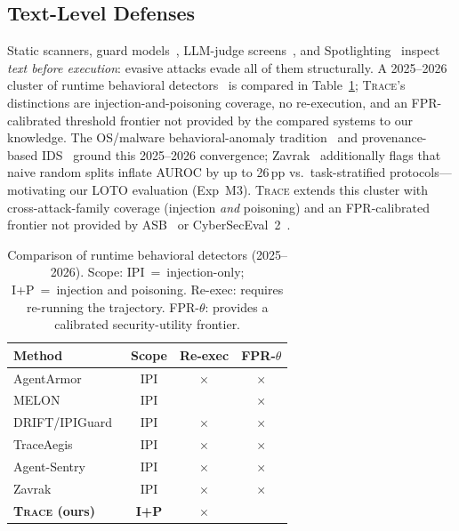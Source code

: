 \documentclass[conference]{IEEEtran}
\begin{document}
\subsection{Text-Level Defenses}

Static scanners, guard models~\cite{inan2023llama}, LLM-judge
screens~\cite{yi2023benchmarking}, and Spotlighting~\cite{hines2024spotlighting}
inspect \emph{text before execution}: evasive attacks evade all of them
structurally.  A 2025--2026 cluster of runtime behavioral
detectors~\cite{liu2025traceaegis,sequeira2026agentsentry,
yu2026frauddetection,zavrak2026contentaware} is compared in
Table~\ref{tab:comparison}; \textsc{Trace}'s distinctions are
injection-and-poisoning coverage, no re-execution, and an
FPR-calibrated threshold frontier not provided by the compared
systems to our knowledge.
The OS/malware behavioral-anomaly tradition~\cite{forrest1996sense,
sekar2001fast,rieck2011automatic,buczak2016survey} and provenance-based
IDS~\cite{zipperle2022pids,cheng2024kairos} ground this 2025--2026
convergence; Zavrak~\cite{zavrak2026contentaware} additionally flags
that naive random splits inflate AUROC by up to 26\,pp vs.\
task-stratified protocols---motivating our LOTO evaluation (Exp~M3).
\textsc{Trace} extends this cluster with cross-attack-family coverage
(injection \emph{and} poisoning) and an FPR-calibrated frontier not
provided by ASB~\cite{zhang2024agentsecuritybench} or
CyberSecEval~2~\cite{bhatt2024cyberseceval2}.

\begin{table}[t]
\centering\small
\caption{Comparison of runtime behavioral detectors (2025--2026).
  Scope: IPI~=~injection-only; I+P~=~injection and poisoning.
  Re-exec: requires re-running the trajectory.
  FPR-$\theta$: provides a calibrated security-utility frontier.}
\label{tab:comparison}
\begin{tabular}{lccc}
\toprule
Method & Scope & Re-exec & FPR-$\theta$ \\
\midrule
AgentArmor~\cite{wang2025agentarmor}              & IPI & $\times$ & $\times$ \\
MELON~\cite{zhu2025melon}                         & IPI & \checkmark & $\times$ \\
DRIFT/IPIGuard~\cite{li2025drift,an2025ipiguard}  & IPI & $\times$ & $\times$ \\
TraceAegis~\cite{liu2025traceaegis}               & IPI & $\times$ & $\times$ \\
Agent-Sentry~\cite{sequeira2026agentsentry}        & IPI & $\times$ & $\times$ \\
Zavrak~\cite{zavrak2026contentaware}              & IPI & $\times$ & $\times$ \\
\textbf{\textsc{Trace} (ours)}                    & \textbf{I+P} & $\times$ & \checkmark \\
\bottomrule
\end{tabular}
\end{table}
\end{document}
